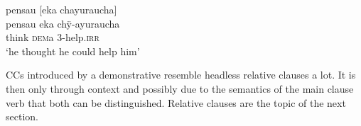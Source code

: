 \ea\label{ex:pensau-2}
\begingl
\glpreamble pensau \textup{[}eka chayuraucha\textup{]}\\
\gla pensau eka chÿ-ayuraucha\\
\glb think \textsc{dem}a 3-help.\textsc{irr}\\
\glft ‘he thought he could help him’
\endgl
\trailingcitation{[jxx-e120516l-1.094]}
\xe


%
%









CCs introduced by a demonstrative resemble headless relative clauses a lot. It is then only through context and possibly due to the semantics of the main clause verb that both can be distinguished. Relative clauses are the topic of the next section.








